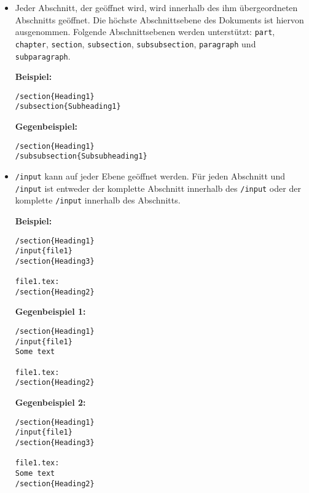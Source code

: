\begin{itemize}
\item Jeder Abschnitt, der geöffnet wird, wird innerhalb des ihm übergeordneten Abschnitts geöffnet.
  Die höchste Abschnittsebene des Dokuments ist hiervon ausgenommen.
  Folgende Abschnittsebenen werden unterstützt:
  \verb|part|, \verb|chapter|, \verb|section|, \verb|subsection|, \verb|subsubsection|, \verb|paragraph| und
  \verb|subparagraph|.

  \textbf{Beispiel:}

\begin{verbatim}
/section{Heading1}
/subsection{Subheading1}

\end{verbatim}
\textbf{Gegenbeispiel:}

\begin{verbatim}
/section{Heading1}
/subsubsection{Subsubheading1}

\end{verbatim}
\clearpage

  \item \verb|/input| kann auf jeder Ebene geöffnet werden.
  Für jeden Abschnitt und \verb|/input| ist entweder der komplette Abschnitt innerhalb des \verb|/input| oder der
  komplette \verb|/input| innerhalb des Abschnitts.

  \textbf{Beispiel:}

\begin{verbatim}
/section{Heading1}
/input{file1}
/section{Heading3}

file1.tex:
/section{Heading2}

\end{verbatim}
\textbf{Gegenbeispiel 1:}

\begin{verbatim}
/section{Heading1}
/input{file1}
Some text

file1.tex:
/section{Heading2}

\end{verbatim}
\textbf{Gegenbeispiel 2:}

\begin{verbatim}
/section{Heading1}
/input{file1}
/section{Heading3}

file1.tex:
Some text
/section{Heading2}

\end{verbatim}
\end{itemize}
